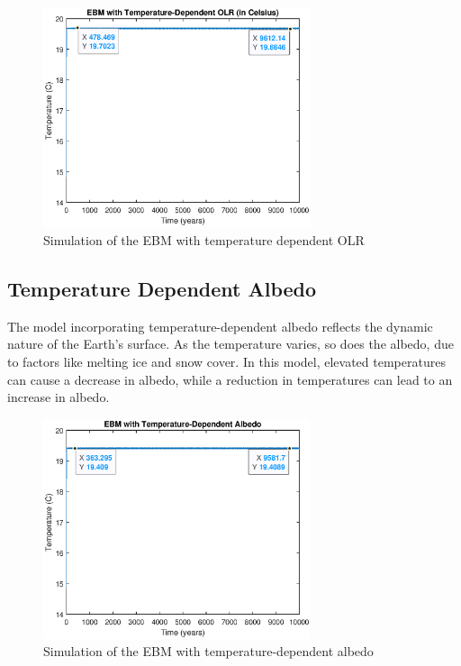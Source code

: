 \documentclass[12pt]{article}
\begin{document}
\begin{figure}[H]
    \centering
    \includegraphics[width=0.7\textwidth]{images/temperature_dependent_olr.eps}
    \caption{Simulation of the EBM with temperature dependent OLR}
    \label{fig:ebm_temperature_olr}
\end{figure}

\subsection{Temperature Dependent Albedo} \label{section:albedo-temperature}
The model incorporating temperature-dependent albedo reflects the dynamic nature of the Earth's surface. As the temperature varies, so does the albedo, due to factors like melting ice and snow cover\cite{kaper-2013-math-ac-albedo}. In this model, elevated temperatures can cause a decrease in albedo, while a reduction in temperatures can lead to an increase in albedo.

\begin{figure}[H]
    \centering
    \includegraphics[width=0.7\textwidth]{images/temperature_dependent_albedo.eps}
    \caption{Simulation of the EBM with temperature-dependent albedo}
    \label{fig:ebm_temperature_albedo}
\end{figure}
\end{document}
